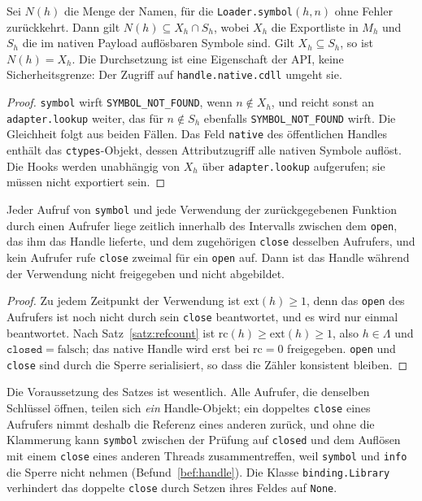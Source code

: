 \begin{satz}[Exportdurchsetzung]
	\label{satz:export}
	Sei $N(h)$ die Menge der Namen, für die \texttt{Loader.symbol}$(h,n)$ ohne Fehler zurückkehrt. Dann gilt $N(h)\subseteq X_h\cap S_h$, wobei $X_h$ die Exportliste in $M_h$ und $S_h$ die im nativen Payload auflösbaren Symbole sind. Gilt $X_h\subseteq S_h$, so ist $N(h)=X_h$. Die Durchsetzung ist eine Eigenschaft der API, keine Sicherheitsgrenze: Der Zugriff auf \texttt{handle.native.cdll} umgeht sie.
\end{satz}

\begin{proof}
	\texttt{symbol} wirft \texttt{SYMBOL\_NOT\_FOUND}, wenn $n\notin X_h$, und reicht sonst an \texttt{adapter.lookup} weiter, das für $n\notin S_h$ ebenfalls \texttt{SYMBOL\_NOT\_FOUND} wirft. Die Gleichheit folgt aus beiden Fällen. Das Feld \texttt{native} des öffentlichen Handles enthält das \texttt{ctypes}-Objekt, dessen Attributzugriff alle nativen Symbole auflöst. Die Hooks werden unabhängig von $X_h$ über \texttt{adapter.lookup} aufgerufen; sie müssen nicht exportiert sein.
\end{proof}

\begin{satz}
	\label{satz:nutzung}
	Jeder Aufruf von \texttt{symbol} und jede Verwendung der zurückgegebenen Funktion durch einen Aufrufer liege zeitlich innerhalb des Intervalls zwischen dem \texttt{open}, das ihm das Handle lieferte, und dem zugehörigen \texttt{close} desselben Aufrufers, und kein Aufrufer rufe \texttt{close} zweimal für ein \texttt{open} auf. Dann ist das Handle während der Verwendung nicht freigegeben und nicht abgebildet.
\end{satz}

\begin{proof}
	Zu jedem Zeitpunkt der Verwendung ist $\mathrm{ext}(h)\ge1$, denn das \texttt{open} des Aufrufers ist noch nicht durch sein \texttt{close} beantwortet, und es wird nur einmal beantwortet. Nach Satz~\ref{satz:refcount} ist $\mathrm{rc}(h)\ge\mathrm{ext}(h)\ge1$, also $h\in\Lambda$ und $\texttt{closed}=\mathrm{falsch}$; das native Handle wird erst bei $\mathrm{rc}=0$ freigegeben. \texttt{open} und \texttt{close} sind durch die Sperre serialisiert, so dass die Zähler konsistent bleiben.
\end{proof}

Die Voraussetzung des Satzes ist wesentlich. Alle Aufrufer, die denselben Schlüssel öffnen, teilen sich \emph{ein} Handle-Objekt; ein doppeltes \texttt{close} eines Aufrufers nimmt deshalb die Referenz eines anderen zurück, und ohne die Klammerung kann \texttt{symbol} zwischen der Prüfung auf \texttt{closed} und dem Auflösen mit einem \texttt{close} eines anderen Threads zusammentreffen, weil \texttt{symbol} und \texttt{info} die Sperre nicht nehmen (Befund~\ref{bef:handle}). Die Klasse \texttt{binding.Library} verhindert das doppelte \texttt{close} durch Setzen ihres Feldes auf \texttt{None}.

